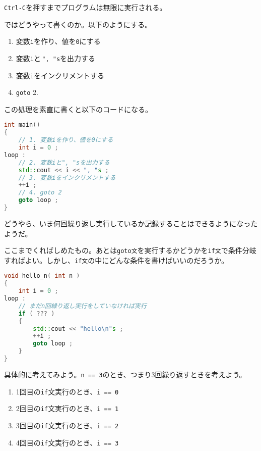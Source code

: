 \texttt{Ctrl-C}を押すまでプログラムは無限に実行される。

ではどうやって書くのか。以下のようにする。

\begin{enumerate}
\def\labelenumi{\arabic{enumi}.}
\item
  変数\texttt{i}を作り、値を\texttt{0}にする
\item
  変数\texttt{i}と\,\texttt{", "s}を出力する
\item
  変数\texttt{i}をインクリメントする
\item
  \texttt{goto} 2.
\end{enumerate}

この処理を素直に書くと以下のコードになる。

\begin{lstlisting}[language={C++}]
int main()
{
    // 1. 変数iを作り、値を0にする
    int i = 0 ;
loop :
    // 2. 変数iと", "sを出力する
    std::cout << i << ", "s ;
    // 3. 変数iをインクリメントする
    ++i ;
    // 4. goto 2
    goto loop ;
}
\end{lstlisting}

どうやら、いま何回繰り返し実行しているか記録することはできるようになったようだ。

ここまでくればしめたもの。あとは\texttt{goto文}を実行するかどうかを\texttt{if文}で条件分岐すればよい。しかし、\texttt{if文}の中にどんな条件を書けばいいのだろうか。

\ifTombow\pagebreak\fi
\begin{lstlisting}[language={C++}]
void hello_n( int n )
{
    int i = 0 ;
loop :
    // まだn回繰り返し実行をしていなければ実行
    if ( ??? )
    {
        std::cout << "hello\n"s ;
        ++i ;
        goto loop ;
    }
}
\end{lstlisting}

具体的に考えてみよう。\texttt{n == 3}のとき、つまり3回繰り返すときを考えよう。

\begin{enumerate}
\def\labelenumi{\arabic{enumi}.}
\item
  1回目の\texttt{if}文実行のとき、\texttt{i == 0}
\item
  2回目の\texttt{if}文実行のとき、\texttt{i == 1}
\item
  3回目の\texttt{if}文実行のとき、\texttt{i == 2}
\item
  4回目の\texttt{if}文実行のとき、\texttt{i == 3}
\end{enumerate}

